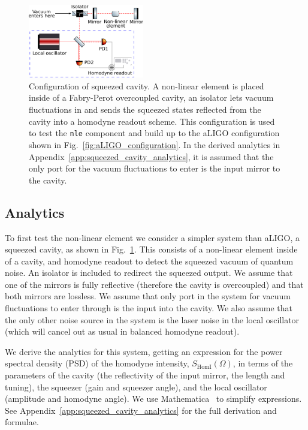 \documentclass[aps,pra,superscriptaddress,reprint,nofootinbib]{revtex4-1}
\newcommand{\code}[1]{\texttt{#1}}
\begin{document}
\begin{figure}[ht!]
	\begin{center}
	\includegraphics[width=0.45\textwidth]{figures/squeezed_cavity.pdf}
	\end{center}
	\caption{Configuration of squeezed cavity. A non-linear element is placed inside of a Fabry-Perot overcoupled cavity, an isolator lets vacuum fluctuations in and sends the squeezed states reflected from the cavity into a homodyne readout scheme. This configuration is used to test the \code{nle} component and build up to the aLIGO configuration shown in Fig.~\ref{fig:aLIGO_configuration}. In the derived analytics in Appendix~\ref{app:squeezed_cavity_analytics}, it is assumed that the only port for the vacuum fluctuations to enter is the input mirror to the cavity.}
	\label{fig:squeezed_cavity}
\end{figure}

\subsection{Analytics}

To first test the non-linear element we consider a simpler system than aLIGO, a squeezed cavity, as shown in Fig.~\ref{fig:squeezed_cavity}. This consists of a non-linear element inside of a cavity, and homodyne readout to detect the squeezed vacuum of quantum noise. An isolator is included to redirect the squeezed output. We assume that one of the mirrors is fully reflective (therefore the cavity is overcoupled) and that both mirrors are lossless. We assume that only port in the system for vacuum fluctuations to enter through is the input into the cavity. We also assume that the only other noise source in the system is the laser noise in the local oscillator (which will cancel out as usual in balanced homodyne readout).

We derive the analytics for this system, getting an expression for the power spectral density (PSD) of the homodyne intensity, $S_{\mathrm{HomI}}(\Omega)$, in terms of the parameters of the cavity (the reflectivity of the input mirror, the length and tuning), the squeezer (gain and squeezer angle), and the local oscillator (amplitude and homodyne angle). We use Mathematica~\cite{mathematica} to simplify expressions. See Appendix~\ref{app:squeezed_cavity_analytics} for the full derivation and formulae.
\end{document}

